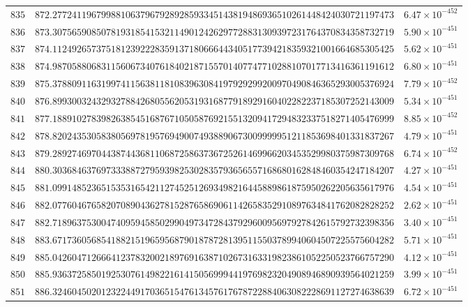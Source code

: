 \documentclass[12pt,reqno]{amsart}
\theoremstyle{remark}
\begin{document}
\begin{longtable}{clc}
$835$ & $872.2772411967998810637967928928593345143819486936510261448424030721197473$ & $6.47\times 10^{-452}$ \\
$836$ & $873.3075659085078193185415321149012426297728831309397231764370834358732719$ & $5.90\times 10^{-451}$ \\
$837$ & $874.1124926573751812392228359137180666443405177394218359321001664685305425$ & $5.62\times 10^{-451}$ \\
$838$ & $874.9870588068311560673407618402187155701407747710288107017713416361191612$ & $6.80\times 10^{-451}$ \\
$839$ & $875.3788091163199741156381181083963084197929299200970490846365293005376924$ & $7.79\times 10^{-452}$ \\
$840$ & $876.8993003243293278842680556205319316877918929160402282237185307252143009$ & $5.34\times 10^{-451}$ \\
$841$ & $877.1889102783982638545168767105058769215513209417294832337518271405476999$ & $8.85\times 10^{-452}$ \\
$842$ & $878.8202435305838056978195769490074938890673009999951211853698401331837267$ & $4.79\times 10^{-451}$ \\
$843$ & $879.2892746970443874436811068725863736725261469966203453529980375987309768$ & $6.74\times 10^{-452}$ \\
$844$ & $880.3036846376973338872795939825302835793656557168680162848460354247184207$ & $4.27\times 10^{-451}$ \\
$845$ & $881.0991485236515353165421127452512693498216445889861875950262205635617976$ & $4.54\times 10^{-451}$ \\
$846$ & $882.0776046765820708904362781528765869061142658352910897634841762082828252$ & $2.62\times 10^{-451}$ \\
$847$ & $882.7189637530047409594585029904973472843792960095697927842615792732398356$ & $3.40\times 10^{-451}$ \\
$848$ & $883.6717360568541882151965956879018787281395115503789940604507225575604282$ & $5.71\times 10^{-451}$ \\
$849$ & $885.0426047126664123783200218976916387102673163319823861052250523766757290$ & $4.12\times 10^{-451}$ \\
$850$ & $885.9363725850192530761498221614150569994419769823204908946890939564021259$ & $3.99\times 10^{-451}$ \\
$851$ & $886.3246045020123224491703651547613457617678722884063082228691127274638639$ & $6.72\times 10^{-451}$ \\

\end{longtable}
\end{document}
